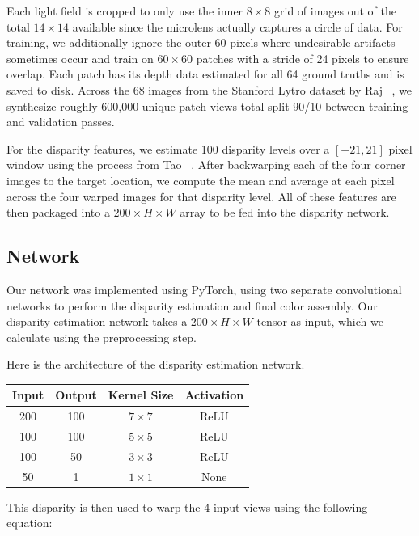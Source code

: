 \documentclass[10pt,twocolumn,letterpaper]{article}
\begin{document}
Each light field is cropped to only use the inner $8 \times 8$ grid of images out of the total $14 \times 14$ available
since the microlens actually captures a circle of data. For training, we additionally ignore the outer 60 pixels where
undesirable artifacts sometimes occur and train on $60\times60$ patches with a stride of 24 pixels to ensure overlap.
Each patch has its depth data estimated for all 64 ground truths and is saved to disk. Across the 68 images from the
Stanford Lytro dataset by Raj \etal~\cite{StanfordLytro}, we synthesize roughly 600,000 unique patch views total split
90/10 between training and validation passes.

For the disparity features, we estimate 100 disparity levels over a $[-21, 21]$ pixel window using the process from Tao \etal~\cite{tao2013depth}.
After backwarping each of the four corner images to the target location, we compute the mean and average at each pixel across the four warped images
for that disparity level. All of these features are then packaged into a $200 \times H \times W$ array to be fed into the disparity network.

\subsection{Network}

Our network was implemented using PyTorch, using two separate convolutional networks to perform the
disparity estimation and final color assembly. Our disparity estimation network takes a 
$200 \times H \times W$ tensor as input, which we calculate using the preprocessing step.

Here is the architecture of the disparity estimation network.

\begin{center}
\begin{tabular}{|c c c c|}
    \hline
    Input & Output & Kernel Size & Activation \\
    \hline
    200 & 100 & $7 \times 7$ & ReLU \\
    100 & 100 & $5 \times 5$ & ReLU \\
    100 & 50 & $3 \times 3$ & ReLU \\
    50 & 1 & $1 \times 1$ & None \\
    \hline
\end{tabular}
\end{center}


This disparity is then used to warp the 4 input views using the following equation:
\end{document}
